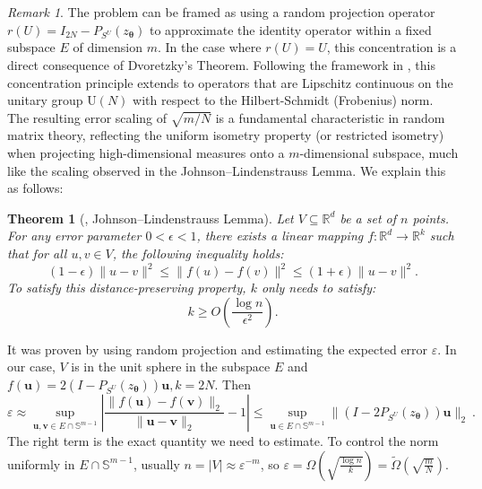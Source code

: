 \documentclass{amsart}
\theoremstyle{plain}
\newtheorem{theorem}{Theorem}
\theoremstyle{definition}
\theoremstyle{remark}
\newtheorem{remark}{Remark}
\begin{document}
\begin{remark}
\label{remark:thm5}
   The problem can be framed as using a random projection operator $r(U) = I_{2N} - P_{S^U}(z_{\bm\theta})$ to approximate the identity operator within a fixed subspace $E$ of dimension $m$. In the case where $r(U) = U$, this concentration is a direct consequence of Dvoretzky’s Theorem. Following the framework in \cite{meckes2019random}, this concentration principle extends to operators that are Lipschitz continuous on the unitary group $\mathrm{U}(N)$ with respect to the Hilbert-Schmidt (Frobenius) norm. The resulting error scaling of $\sqrt{m/N}$ is a fundamental characteristic in random matrix theory, reflecting the uniform isometry property (or restricted isometry) when projecting high-dimensional measures onto a $m$-dimensional subspace, much like the scaling observed in the Johnson–Lindenstrauss Lemma. We explain this as follows:
\end{remark}
\begin{theorem}[\cite{Vershynin_2018}, Johnson–Lindenstrauss Lemma]
    Let $V \subseteq \mathbb{R}^d$ be a set of $n$ points. For any error parameter $0 < \epsilon < 1$, there exists a linear mapping $f: \mathbb{R}^d \to \mathbb{R}^k$ such that for all $u, v \in V$, the following inequality holds:$$(1 - \epsilon) \|u - v\|^2 \le \|f(u) - f(v)\|^2 \le (1 + \epsilon) \|u - v\|^2.$$ To satisfy this distance-preserving property, $k$ only needs to satisfy:$$k \ge O\left( \frac{\log n}{\epsilon^2} \right).$$
\end{theorem}
It was proven by using random projection and estimating the expected error $\varepsilon$. 
In our case, $V$ is in the unit sphere in the subspace $E$ and $f(\bm u)=2(I-P_{S^U}(z_{\bm\theta}))\bm u, k=2N$. Then \[\varepsilon\approx\sup_{\bm u,\bm v\in E\cap \mathbb S^{m-1}} \left|\frac{\|f(\bm u)-f(\bm v)\|_2}{\|\bm u-\bm v\|_2}-1\right|\leq\sup_{\bm u\in E\cap \mathbb S^{m-1}}\|(I-2P_{S^U}(z_{\bm\theta}))\bm u\|_2\ .\] 
The right term is the exact quantity we need to estimate. To control the norm uniformly in $E\cap \mathbb S^{m-1}$, usually $n=|V|\approx \varepsilon^{-m}$, so $\varepsilon=\Omega\left(\sqrt{\frac{\log n}{k}}\right)=\tilde \Omega\left(\sqrt{\frac{m}{N}}\right)$.
\end{document}
